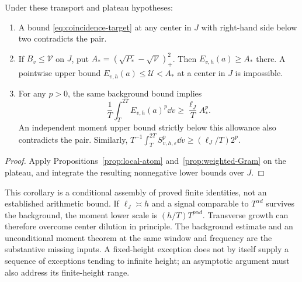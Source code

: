 \begin{corollary}
\label{cor:localized-contract}
Under these transport and plateau hypotheses:
\begin{enumerate}[label=(\roman*)]
\item A bound \eqref{eq:coincidence-target} at any center in \(J\)
with right-hand side below two contradicts the pair.
\item If \(B_v\le\mathcal V\) on \(J\), put
\(A_*=(\sqrt{P_*}-\sqrt{\mathcal V})_+^2\).
Then \(E_{v,h}(a)\ge A_*\) there. A pointwise upper bound
\(E_{v,h}(a)\le\mathcal U<A_*\) at a center in \(J\) is impossible.
\item For any \(p>0\), the same background bound implies
\begin{equation}\label{eq:moment-lower}
 \frac1T\int_T^{2T} E_{v,h}(a)^p\dd v
                  \ge\frac{\ell_J}{T}A_*^p.
\end{equation}
An independent moment upper bound strictly below this allowance
also contradicts the pair. Similarly,
\(T^{-1}\int_T^{2T}S_{v,h,\varepsilon}^p\dd v
\ge(\ell_J/T)2^p\).
\end{enumerate}
\end{corollary}
\begin{proof}
Apply Propositions~\ref{prop:local-atom} and~\ref{prop:weighted-Gram}
on the plateau, and integrate the resulting nonnegative lower bounds
over \(J\).
\end{proof}
This corollary is a conditional assembly of proved finite identities,
not an established arithmetic bound. If \(\ell_J\asymp h\) and a
signal comparable to \(T^{\alpha d}\) survives the background, the
moment lower scale is \((h/T)T^{p\alpha d}\). Transverse growth can
therefore overcome center dilution in principle. The background estimate
and an unconditional moment theorem at the same window and frequency
are the substantive missing inputs. A fixed-height exception does not
by itself supply a sequence of exceptions tending to infinite height;
an asymptotic argument must also address its finite-height range.

